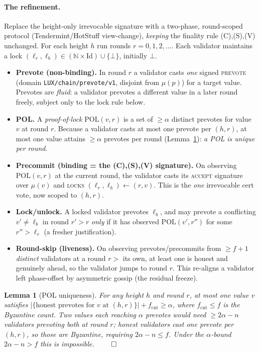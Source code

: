 \documentclass[11pt]{article}
\newtheorem{lemma}{Lemma}
\begin{document}
\paragraph{The refinement.}
Replace the height-only irrevocable signature with a two-phase, round-scoped protocol
(Tendermint/HotStuff view-change), \emph{keeping} the finality rule (C),(S),(V)
unchanged. For each height $h$ run rounds $r=0,1,2,\dots$. Each validator maintains a
lock $(\ell_r,\ell_b)\in(\mathbb{N}\times\mathrm{Id})\cup\{\bot\}$, initially $\bot$.
\begin{itemize}
  \item \textbf{Prevote (non-binding).} In round $r$ a validator casts \emph{one} signed
        \textsc{prevote} (domain \texttt{LUX/chain/prevote/v1}, disjoint from
        $\mu(p)$) for a target value. Prevotes are \emph{fluid}: a validator prevotes a
        different value in a later round freely, subject only to the lock rule below.
  \item \textbf{POL.} A \emph{proof-of-lock} $\mathrm{POL}(v,r)$ is a set of
        $\ge\alpha$ distinct prevotes for value $v$ at round $r$. Because a validator
        casts at most one prevote per $(h,r)$, at most one value attains $\ge\alpha$
        prevotes per round (Lemma~\ref{lem:poluniq}): \emph{a POL is unique per round}.
  \item \textbf{Precommit (binding = the (C),(S),(V) signature).} On observing
        $\mathrm{POL}(v,r)$ at the current round, the validator casts its \textsc{accept}
        signature over $\mu(v)$ and \textsc{locks} $(\ell_r,\ell_b)\gets(r,v)$. This is
        the \emph{one} irrevocable cert vote, now scoped to $(h,r)$.
  \item \textbf{Lock/unlock.} A locked validator prevotes $\ell_b$, and may prevote a
        conflicting $v'\neq\ell_b$ in round $r'>r$ \emph{only} if it has observed
        $\mathrm{POL}(v',r'')$ for some $r''>\ell_r$ (a fresher justification).
  \item \textbf{Round-skip (liveness).} On observing prevotes/precommits from $\ge f{+}1$
        \emph{distinct} validators at a round $r>$ its own, at least one is honest and
        genuinely ahead, so the validator jumps to round $r$. This re-aligns a validator
        left phase-offset by asymmetric gossip (the residual freeze).
\end{itemize}

\begin{lemma}[POL uniqueness]\label{lem:poluniq}
For any height $h$ and round $r$, at most one value $v$ satisfies
$|\{\text{honest prevotes for }v\text{ at }(h,r)\}|+f_{\mathrm{cnt}}\ge\alpha$, where
$f_{\mathrm{cnt}}\le f$ is the Byzantine count. Two values each reaching $\alpha$ prevotes
would need $\ge 2\alpha-n$ validators prevoting both at round $r$; honest validators cast
one prevote per $(h,r)$, so those are Byzantine, requiring $2\alpha-n\le f$. Under the
$\alpha$-bound $2\alpha-n>f$ this is impossible. $\qed$
\end{lemma}
\end{document}
